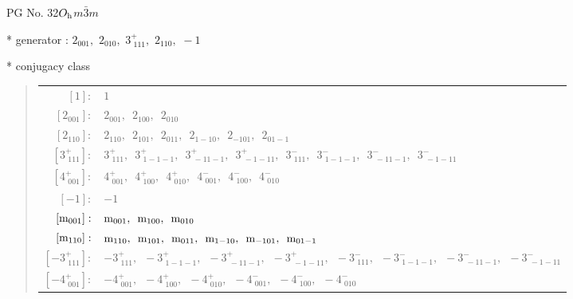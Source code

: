 \documentclass[fleqn,8pt]{jsarticle}
\begin{document}
\setcounter{MaxMatrixCols}{32}

\renewcommand{\tablename}{Table~}
\renewcommand{\figurename}{Figure~}
\begin{center}
\LARGE
PG No. 32\quad$O_{\rm h}$\quad$m\bar{3}m$\quad[ cubic ]
\end{center}

* generator : $2{}_{001},\,\,2{}_{010},\,\,3^{+}_{\,\,111},\,\,2{}_{110},\,\,-1$

* conjugacy class
\begin{quote}
\begin{tabular}{rl}
$ [1]: $ & $ 1 $ \\
$ [2{}_{001}]: $ & $ 2{}_{001},\,\,\,2{}_{100},\,\,\,2{}_{010} $ \\
$ [2{}_{110}]: $ & $ 2{}_{110},\,\,\,2{}_{101},\,\,\,2{}_{011},\,\,\,2{}_{1-10},\,\,\,2{}_{-101},\,\,\,2{}_{01-1} $ \\
$ [3^{+}_{\,\,111}]: $ & $ 3^{+}_{\,\,111},\,\,\,3^{+}_{\,\,1-1-1},\,\,\,3^{+}_{\,\,-11-1},\,\,\,3^{+}_{\,\,-1-11},\,\,\,3^{-}_{\,\,111},\,\,\,3^{-}_{\,\,1-1-1},\,\,\,3^{-}_{\,\,-11-1},\,\,\,3^{-}_{\,\,-1-11} $ \\
$ [4^{+}_{\,\,001}]: $ & $ 4^{+}_{\,\,001},\,\,\,4^{+}_{\,\,100},\,\,\,4^{+}_{\,\,010},\,\,\,4^{-}_{\,\,001},\,\,\,4^{-}_{\,\,100},\,\,\,4^{-}_{\,\,010} $ \\
$ [-1]: $ & $ -1 $ \\
$ [{\rm m}_{001}]: $ & $ {\rm m}_{001},\,\,\,{\rm m}_{100},\,\,\,{\rm m}_{010} $ \\
$ [{\rm m}_{110}]: $ & $ {\rm m}_{110},\,\,\,{\rm m}_{101},\,\,\,{\rm m}_{011},\,\,\,{\rm m}_{1-10},\,\,\,{\rm m}_{-101},\,\,\,{\rm m}_{01-1} $ \\
$ [-3^{+}_{\,\,111}]: $ & $ -3^{+}_{\,\,111},\,\,\,-3^{+}_{\,\,1-1-1},\,\,\,-3^{+}_{\,\,-11-1},\,\,\,-3^{+}_{\,\,-1-11},\,\,\,-3^{-}_{\,\,111},\,\,\,-3^{-}_{\,\,1-1-1},\,\,\,-3^{-}_{\,\,-11-1},\,\,\,-3^{-}_{\,\,-1-11} $ \\
$ [-4^{+}_{\,\,001}]: $ & $ -4^{+}_{\,\,001},\,\,\,-4^{+}_{\,\,100},\,\,\,-4^{+}_{\,\,010},\,\,\,-4^{-}_{\,\,001},\,\,\,-4^{-}_{\,\,100},\,\,\,-4^{-}_{\,\,010} $
\end{tabular}
\end{quote}
\end{document}
